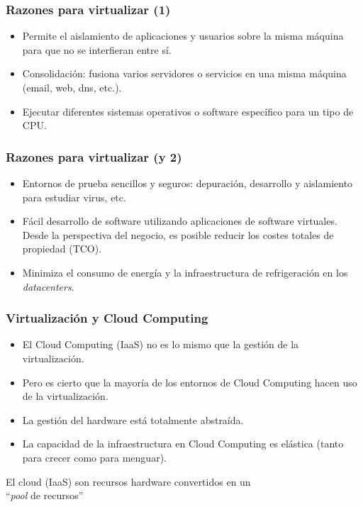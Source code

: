 \documentclass{beamer}
\begin{document}
\begin{frame}
\frametitle{Razones para virtualizar (1)}

\begin{itemize}
\pause
\item Permite el \alert{aislamiento} de aplicaciones y usuarios sobre la misma máquina para que no se interfieran entre sí.
\item \alert{Consolidación}: fusiona varios servidores o servicios en una misma máquina (email, web, dns, etc.).
\item Ejecutar diferentes sistemas operativos o software específico para un tipo de CPU.
\end{itemize}

\end{frame}


\begin{frame}
\frametitle{Razones para virtualizar (y 2)}

\begin{itemize}
\item \alert{Entornos de prueba} sencillos y seguros: depuración, desarrollo y aislamiento para estudiar virus, etc.
\item \alert{Fácil desarrollo} de software utilizando aplicaciones de software virtuales. Desde la perspectiva del negocio, es posible reducir los costes totales de propiedad (TCO).
\item \alert{Minimiza el consumo de energía} y la infraestructura de refrigeración en los \textit{datacenters}.
\end{itemize}

\end{frame}




\begin{frame}
\frametitle{Virtualización y Cloud Computing}

\begin{itemize}
\item El Cloud Computing (IaaS) \alert{no} es lo mismo que la gestión de la virtualización.
\item Pero es cierto que la mayoría de los entornos de Cloud Computing hacen uso de la virtualización.
\item La gestión del hardware está totalmente abstraída.
\item La capacidad de la infraestructura en Cloud Computing es elástica (tanto para crecer como para menguar).
\end{itemize}

\begin{center}
\alert{El cloud (IaaS) son recursos hardware convertidos en un \\ ``\textit{pool} de recursos''}
\end{center}


\end{frame}
\end{document}
